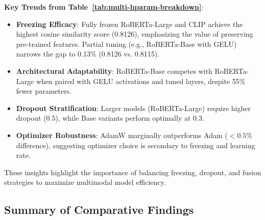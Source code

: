 \noindent \textbf{Key Trends from Table~\ref{tab:multi-hparam-breakdown}}:
\begin{itemize}
    \item \textbf{Freezing Efficacy}: Fully frozen RoBERTa-Large and CLIP achieve the highest cosine similarity score (0.8126), emphasizing the value of preserving pre-trained features. Partial tuning (e.g., RoBERTa-Base with GELU) narrows the gap to 0.13\% (0.8126 vs. 0.8115).
    \item \textbf{Architectural Adaptability}: RoBERTa-Base competes with RoBERTa-Large when paired with GELU activations and tuned layers, despite 55\% fewer parameters.
    \item \textbf{Dropout Stratification}: Larger models (RoBERTa-Large) require higher dropout (0.5), while Base variants perform optimally at 0.3.
    \item \textbf{Optimizer Robustness}: AdamW marginally outperforms Adam ($<0.5\%$ difference), suggesting optimizer choice is secondary to freezing and learning rate.
\end{itemize}

These insights highlight the importance of balancing freezing, dropout, and fusion strategies to maximize multimodal model efficiency.

\subsection{Summary of Comparative Findings}


